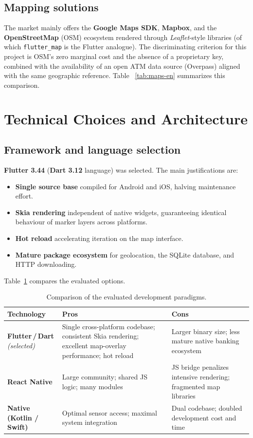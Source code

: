 \documentclass[11pt,a4paper]{article}
\newcommand{\code}[1]{\texttt{#1}}
\begin{document}
\subsection{Mapping solutions}
The market mainly offers the \textbf{Google Maps SDK}, \textbf{Mapbox}, and the
\textbf{OpenStreetMap} (OSM) ecosystem rendered through \emph{Leaflet}-style
libraries (of which \code{flutter\_map} is the Flutter analogue). The
discriminating criterion for this project is OSM's zero marginal cost and the
absence of a proprietary key, combined with the availability of an open ATM data
source (Overpass) aligned with the same geographic reference. Table~%
\ref{tab:maps-en} summarizes this comparison.

\section{Technical Choices and Architecture}
\subsection{Framework and language selection}
\textbf{Flutter 3.44} (\textbf{Dart 3.12} language) was selected. The main
justifications are:
\begin{itemize}[leftmargin=1.4em]
  \item \textbf{Single source base} compiled for Android and iOS, halving
  maintenance effort.
  \item \textbf{Skia rendering} independent of native widgets, guaranteeing
  identical behaviour of marker layers across platforms.
  \item \textbf{Hot reload} accelerating iteration on the map interface.
  \item \textbf{Mature package ecosystem} for geolocation, the SQLite database,
  and HTTP downloading.
\end{itemize}
Table~\ref{tab:framework-en} compares the evaluated options.

\begin{table}[ht]
\centering
\caption{Comparison of the evaluated development paradigms.}
\label{tab:framework-en}
\small
\begin{tabular}{>{\raggedright\arraybackslash}p{2.6cm} >{\raggedright\arraybackslash}p{5.4cm} >{\raggedright\arraybackslash}p{5.4cm}}
\toprule
\textbf{Technology} & \textbf{Pros} & \textbf{Cons} \\
\midrule
\textbf{Flutter\,/\,Dart} \textit{(selected)} &
Single cross-platform codebase; consistent Skia rendering; excellent map-overlay
performance; hot reload &
Larger binary size; less mature native banking ecosystem \\
\midrule
\textbf{React Native} &
Large community; shared JS logic; many modules &
JS bridge penalizes intensive rendering; fragmented map libraries \\
\midrule
\textbf{Native (Kotlin / Swift)} &
Optimal sensor access; maximal system integration &
Dual codebase; doubled development cost and time \\
\bottomrule
\end{tabular}
\end{table}
\end{document}
